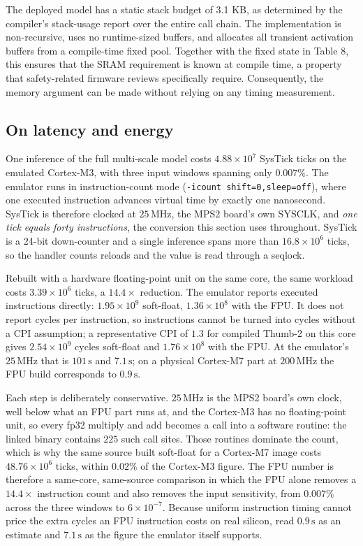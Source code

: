 The deployed model has a static stack budget of 3.1 KB, as determined by the compiler’s stack-usage report 
over the entire call chain. The implementation is non-recursive, uses no runtime-sized buffers, 
and allocates all transient activation buffers from a compile-time fixed pool. Together with the fixed state in Table 8, 
this ensures that the SRAM requirement is known at compile time, a property that safety-related firmware reviews
specifically require. Consequently, the memory argument can be made without relying on any timing measurement.

\subsection{On latency and energy}
\label{sec:latency}

One inference of the full multi-scale model costs $4.88\times10^{7}$
SysTick ticks on the emulated Cortex-M3, with three input windows
spanning only $0.007\%$. The emulator runs in instruction-count mode
(\texttt{-icount shift=0,sleep=off}), where one executed instruction
advances virtual time by exactly one nanosecond. SysTick is therefore
clocked at $25\,\mathrm{MHz}$, the MPS2 board's own SYSCLK, and
\emph{one tick equals forty instructions}, the conversion this section
uses throughout. SysTick is a 24-bit down-counter and a single
inference spans more than $16.8\times10^{6}$ ticks, so the handler
counts reloads and the value is read through a seqlock.

Rebuilt with a hardware floating-point unit on the same core, the same
workload costs $3.39\times10^{6}$ ticks, a $14.4\times$ reduction. The
emulator reports executed instructions directly: $1.95\times10^{9}$
soft-float, $1.36\times10^{8}$ with the FPU. It does not report cycles
per instruction, so instructions cannot be turned into cycles without a
CPI assumption; a representative CPI of $1.3$ for compiled Thumb-2 on
this core gives $2.54\times10^{9}$ cycles soft-float and
$1.76\times10^{8}$ with the FPU. At the emulator's $25\,\mathrm{MHz}$
that is $101\,\mathrm{s}$ and $7.1\,\mathrm{s}$; on a physical
Cortex-M7 part at $200\,\mathrm{MHz}$ the FPU build corresponds to
$0.9\,\mathrm{s}$.

Each step is deliberately conservative. $25\,\mathrm{MHz}$ is the MPS2
board's own clock, well below what an FPU part runs at, and the
Cortex-M3 has no floating-point unit, so every fp32 multiply and add
becomes a call into a software routine: the linked binary contains
$225$ such call sites. Those routines dominate the count, which is why
the same source built soft-float for a Cortex-M7 image costs
$48.76\times10^{6}$ ticks, within $0.02\%$ of the Cortex-M3 figure. The
FPU number is therefore a same-core, same-source comparison in which
the FPU alone removes a $14.4\times$ instruction count and also removes
the input sensitivity, from $0.007\%$ across the three windows to
$6\times10^{-7}$. Because uniform instruction timing cannot price the
extra cycles an FPU instruction costs on real silicon, read
$0.9\,\mathrm{s}$ as an estimate and $7.1\,\mathrm{s}$ as the figure
the emulator itself supports.

